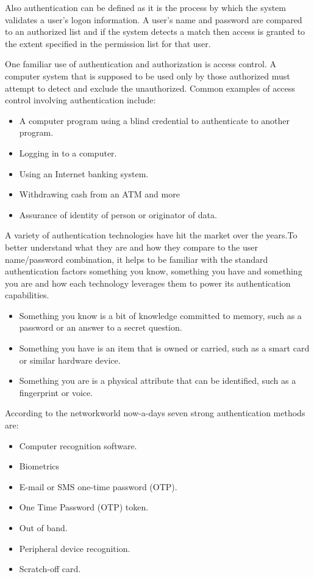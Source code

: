 Also authentication can be defined as it is the process by which the system validates a user's logon information. A user's name and password are compared to an authorized list and if the system detects a match then access is granted to the extent specified in the permission list for that user.

One familiar use of authentication and authorization is access control. A computer system that is supposed to be used only by those authorized must attempt to detect and exclude the unauthorized. Common examples of access control involving authentication include:
\begin{itemize}	
	\item A computer program using a blind credential to authenticate to another program.
	\item Logging in to a computer.	
	\item Using an Internet banking system.
	\item Withdrawing cash from an ATM and more
	\item Assurance of identity of person or originator of data.
\end{itemize}

 A variety of authentication technologies have hit the market over the years.To better understand what they are and how they compare to the user name/password combination, it helps to be familiar with the standard authentication factors something you know, something you have and something you are and how each technology leverages them to power its authentication capabilities.
 \begin{itemize}	
	\item Something you know is a bit of knowledge committed to memory, such as a password or
	 an answer to a secret question.
	\item Something you have is an item that is owned or carried, such as a smart card or similar
	 hardware device.
	\item	 Something you are is a physical attribute that can be identified, such as a fingerprint or voice.
\end{itemize}

According to the networkworld \cite{ref_21_networld} now-a-days seven strong authentication methods are:
\begin{itemize}
\item Computer recognition software.
\item Biometrics
\item E-mail or SMS one-time password (OTP).
\item One Time Password (OTP) token.
\item Out of band.
\item Peripheral device recognition.
\item Scratch-off card.
\end{itemize}	

